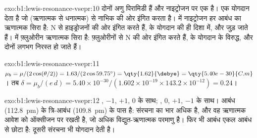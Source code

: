 \begin{solution}{exo:b1:lewis-resonance-vsepr:10}
दोनों अणु पिरामिडी हैं और नाइट्रोजन पर एक  है। 
एक योगदान देता है जो (ऋणात्मक से धनात्मक)  से
नाभिक की ओर इंगित करता है।  में नाइट्रोजन हर आबंध का ऋणात्मक सिरा है:
 N से हाइड्रोजनों की ओर इंगित करते हैं,  के योगदान की
ही दिशा में, और जुड़ जाते हैं।  में
फ़्लुओरीन ऋणात्मक सिरा है:  फ़्लुओरीनों से
N की ओर इंगित करते हैं,  के योगदान के विरुद्ध, और दोनों लगभग निरस्त हो जाते हैं।
\end{solution}

\begin{solution}{exo:b1:lewis-resonance-vsepr:11}
$\mu_b = \mu/(2\cos(\theta/2)) = 1.63/(2\cos 59.75^\circ) =
\qty{1.62}{\debye} = \qty{5.40e-30}{C.m}$। तब $\delta = \mu_b/(e\,d) =
5.40 \times 10^{-30}/(1.602 \times 10^{-19} \times 143.2 \times 10^{-12})
= 0.24$।
\end{solution}

\begin{solution}{exo:b1:lewis-resonance-vsepr:12}
,  $-1$, $+1$, $0$ के साथ; , $0$,
$+1$, $-1$ के साथ।  आबंध (\qty{112.8}{pm})  के त्रि-आबंध
(\qty{109.8}{pm}) के पास है: संरचना  का भार अधिक है,
और वह ऋणात्मक आवेश को ऑक्सीजन पर रखती है, जो अधिक विद्युत-ऋणात्मक
परमाणु है। फिर भी  आबंध एकल आबंध से छोटा है: दूसरी
संरचना भी योगदान देती है।
\end{solution}

